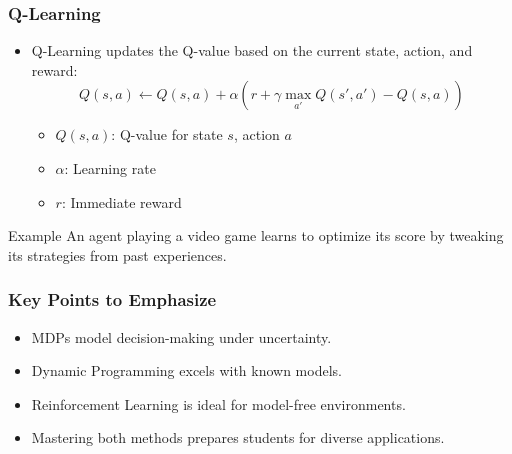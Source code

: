 \documentclass[aspectratio=169]{beamer}
\begin{document}
\begin{frame}[fragile]
    \frametitle{Q-Learning}
    \begin{itemize}
        \item Q-Learning updates the Q-value based on the current state, action, and reward:
        \begin{equation}
        Q(s,a) \gets Q(s,a) + \alpha \left( r + \gamma \max_{a'} Q(s',a') - Q(s,a) \right)
        \end{equation}
        \begin{itemize}
            \item \( Q(s,a) \): Q-value for state \( s \), action \( a \)
            \item \( \alpha \): Learning rate
            \item \( r \): Immediate reward
        \end{itemize}
    \end{itemize}

    \begin{block}{Example}
        An agent playing a video game learns to optimize its score by tweaking its strategies from past experiences.
    \end{block}
\end{frame}

\begin{frame}[fragile]
    \frametitle{Key Points to Emphasize}
    \begin{itemize}
        \item MDPs model decision-making under uncertainty.
        \item Dynamic Programming excels with known models.
        \item Reinforcement Learning is ideal for model-free environments.
        \item Mastering both methods prepares students for diverse applications.
    \end{itemize}
\end{frame}
\end{document}
